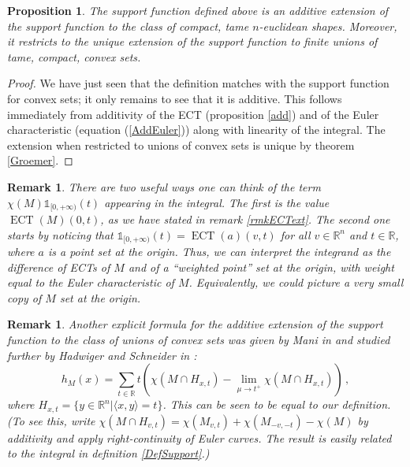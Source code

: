 \documentclass[a4paper]{article}
\newtheorem{prop}[theorem]{Proposition}
\newtheorem{remark}[theorem]{Remark}
\newcommand{\ECT}{\operatorname{ECT}}
\newcommand{\bb}{\mathbb}
\newcommand{\la}{\langle}
\newcommand{\ra}{\rangle}
\begin{document}
\begin{prop}
	\label{SuppAddExt}
	The support function defined above is an additive extension of the support function to the class of compact, tame $n$-euclidean shapes. Moreover, it restricts to the unique extension of the support function to finite unions of tame, compact, convex sets.
\end{prop}

\begin{proof}
	We have just seen that the definition matches with the support function for convex sets; it only remains to see that it is additive. This follows immediately from additivity of the ECT (proposition \ref{add}) and of the Euler characteristic (equation (\ref{AddEuler})) along with linearity of the integral. The extension when restricted to unions of convex sets is unique by theorem \ref{Groemer}.
\end{proof}

\begin{remark}
	There are two useful ways one can think of the term $\chi(M)\bb 1_{[0,+\infty)}(t)$ appearing in the integral. The first is the value $\ECT(M)(0,t)$, as we have stated in remark \ref{rmkECText}. The second one starts by noticing that $\bb 1_{[0, +\infty)}(t)=\ECT(a)(v,t)$ for all $v\in \bb R^n$ and $t\in \bb R$, where $a$ is a point set at the origin. Thus, we can interpret the integrand as the difference of ECTs of $M$ and of a ``weighted point'' set at the origin, with weight equal to the Euler characteristic of $M$. Equivalently, we could picture a very small copy of $M$ set at the origin.
\end{remark}

\begin{remark}
Another explicit formula for the additive extension of the support function to the class of unions of convex sets was given by Mani in \cite{mani_angle_1971} and studied further by Hadwiger and Schneider in \cite{hadwiger1971vektorielle}:
\[ h_M(x)=\sum_{t \in \mathbb R}  t (\chi(M \cap H_{x, t})-\lim_{\mu \to t^+} \chi(M \cap H_{x, t}))\, ,\]
where $H_{x, t}=\{ y \in \bb R^n | \la x,y\ra = t \}$. This can be seen to be equal to our definition. (To see this, write $\chi(M \cap H_{v,t})=\chi(M_{v,t})+\chi(M_{-v,-t})-\chi(M)$ by additivity and apply right-continuity of Euler curves. The result is easily related to the integral in definition \ref{DefSupport}.) 
\end{remark}
\end{document}
